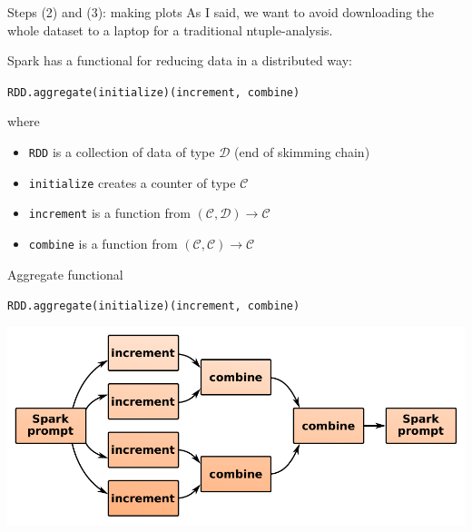 \documentclass{beamer}
\begin{document}
\begin{frame}[fragile]{Steps (2) and (3): making plots}
As I said, we want to avoid downloading the whole dataset to a laptop for a traditional ntuple-analysis.

\vspace{0.5 cm}
Spark has a functional for reducing data in a distributed way:

\begin{center}
\tt \small RDD.aggregate(initialize)(increment, combine)
\end{center}

where
\begin{itemize}
\item {\tt \small RDD} is a collection of data of type $\mathcal{D}$ (end of skimming chain)
\item {\tt \small initialize} creates a counter of type $\mathcal{C}$
\item {\tt \small increment} is a function from $(\mathcal{C},\mathcal{D}) \to \mathcal{C}$
\item {\tt \small combine} is a function from $(\mathcal{C},\mathcal{C}) \to \mathcal{C}$
\end{itemize}
\end{frame}

\begin{frame}{Aggregate functional}

\begin{center}
\tt \small RDD.aggregate(initialize)(increment, combine)
\end{center}

\vfill
\includegraphics[width=\linewidth]{aggregate.pdf}
\end{frame}
\end{document}

